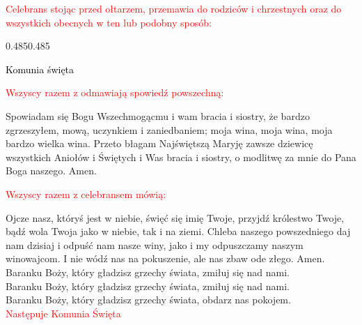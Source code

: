 \documentclass[11pt, a5paper]{extarticle}
\begin{document}
\textcolor{red}{Celebrans stojąc przed ołtarzem, przemawia do rodziców i chrzestnych oraz do wszystkich obecnych w ten lub podobny sposób:}

\begin{Parallel}[v]{0.485\textwidth}{0.485\textwidth}
\end{Parallel}

\begin{center}
\Large
\noindent\textcolor{black}{Komunia święta}
\end{center}

\textcolor{red}{Wszyscy razem z odmawiają spowiedź powszechną:}

Spowiadam się Bogu Wszechmogącmu i wam bracia i siostry, że bardzo zgrzeszyłem, mową, uczynkiem i zaniedbaniem;
moja wina, moja wina, moja bardzo wielka wina.
Przeto błagam Najświętszą Maryję zawsze dziewicę
wszystkich Aniołów i Świętych
i Was bracia i siostry,
o modlitwę za mnie do Pana Boga naszego.
Amen.

\textcolor{red}{Wszyscy razem z celebransem mówią:}

Ojcze nasz, któryś jest w niebie,
święć się imię Twoje,
przyjdź królestwo Twoje,
bądź wola Twoja
jako w niebie, tak i na ziemi.
Chleba naszego powszedniego daj nam dzisiaj
i odpuść nam nasze winy,
jako i my odpuszczamy naszym winowajcom.
I nie wódź nas na pokuszenie,
ale nas zbaw ode złego. Amen. \\[0.3cm]
Baranku Boży, który gładzisz grzechy świata, zmiłuj się nad nami. \\
Baranku Boży, który gładzisz grzechy świata, zmiłuj się nad nami. \\
Baranku Boży, który gładzisz grzechy świata, obdarz nas pokojem. \\[0.3cm]
\textcolor{red}{Następuje Komunia Święta}
\end{document}

